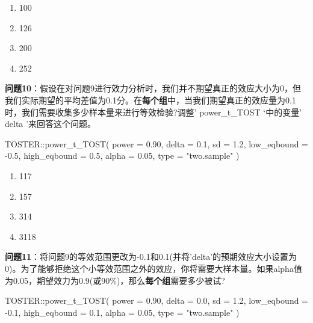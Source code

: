 \documentclass[
  letterpaper,
  DIV=11,
  numbers=noendperiod]{scrreprt}
\newenvironment{Shaded}{\begin{snugshade}}{\end{snugshade}}
\newcommand{\AttributeTok}[1]{\textcolor[rgb]{0.40,0.45,0.13}{#1}}
\newcommand{\FloatTok}[1]{\textcolor[rgb]{0.68,0.00,0.00}{#1}}
\newcommand{\FunctionTok}[1]{\textcolor[rgb]{0.28,0.35,0.67}{#1}}
\newcommand{\NormalTok}[1]{\textcolor[rgb]{0.00,0.23,0.31}{#1}}
\newcommand{\SpecialCharTok}[1]{\textcolor[rgb]{0.37,0.37,0.37}{#1}}
\newcommand{\StringTok}[1]{\textcolor[rgb]{0.13,0.47,0.30}{#1}}
\providecommand{\tightlist}{%
  \setlength{\itemsep}{0pt}\setlength{\parskip}{0pt}}\usepackage{longtable,booktabs,array}
\begin{document}
\begin{enumerate}
\def\labelenumi{\Alph{enumi})}
\tightlist
\item
  100
\item
  126
\item
  200
\item
  252
\end{enumerate}

\textbf{问题10}：假设在对问题9进行效力分析时，我们并不期望真正的效应大小为0，但我们实际期望的平均差值为0.1分。在\textbf{每个组}中，当我们期望真正的效应量为0.1时，我们需要收集多少样本量来进行等效检验?调整'
power\_t\_TOST `中的变量' delta '来回答这个问题。

\begin{Shaded}
\begin{Highlighting}[]
\NormalTok{TOSTER}\SpecialCharTok{::}\FunctionTok{power\_t\_TOST}\NormalTok{(}
  \AttributeTok{power =} \FloatTok{0.90}\NormalTok{,}
  \AttributeTok{delta =} \FloatTok{0.1}\NormalTok{,}
  \AttributeTok{sd =} \FloatTok{1.2}\NormalTok{,}
  \AttributeTok{low\_eqbound =} \SpecialCharTok{{-}}\FloatTok{0.5}\NormalTok{,}
  \AttributeTok{high\_eqbound =} \FloatTok{0.5}\NormalTok{,}
  \AttributeTok{alpha =} \FloatTok{0.05}\NormalTok{,}
  \AttributeTok{type =} \StringTok{"two.sample"}
\NormalTok{)}
\end{Highlighting}
\end{Shaded}

\begin{enumerate}
\def\labelenumi{\Alph{enumi})}
\tightlist
\item
  117
\item
  157
\item
  314
\item
  3118
\end{enumerate}

\textbf{问题11}：将问题9的等效范围更改为-0.1和0.1(并将'delta'的预期效应大小设置为0)。为了能够拒绝这个小等效范围之外的效应，你将需要大样本量。如果alpha值为0.05，期望效力为0.9(或90\%)，那么\textbf{每个组}需要多少被试?

\begin{Shaded}
\begin{Highlighting}[]
\NormalTok{TOSTER}\SpecialCharTok{::}\FunctionTok{power\_t\_TOST}\NormalTok{(}
  \AttributeTok{power =} \FloatTok{0.90}\NormalTok{,}
  \AttributeTok{delta =} \FloatTok{0.0}\NormalTok{,}
  \AttributeTok{sd =} \FloatTok{1.2}\NormalTok{,}
  \AttributeTok{low\_eqbound =} \SpecialCharTok{{-}}\FloatTok{0.1}\NormalTok{,}
  \AttributeTok{high\_eqbound =} \FloatTok{0.1}\NormalTok{,}
  \AttributeTok{alpha =} \FloatTok{0.05}\NormalTok{,}
  \AttributeTok{type =} \StringTok{"two.sample"}
\NormalTok{)}
\end{Highlighting}
\end{Shaded}
\end{document}
